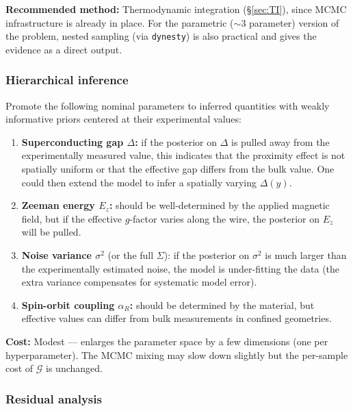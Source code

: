 \documentclass[11pt]{article}
\newcommand{\cG}{\mathcal{G}}
\theoremstyle{plain}
\theoremstyle{remark}
\theoremstyle{definition}
\begin{document}
\medskip
\noindent\textbf{Recommended method:} Thermodynamic integration 
(\S\ref{sec:TI}), since MCMC infrastructure is already in place. For the 
parametric ($\sim 3$ parameter) version of the problem, nested sampling 
(via \texttt{dynesty}) is also practical and gives the evidence as a 
direct output.

\subsubsection{Hierarchical inference}

Promote the following nominal parameters to inferred quantities with 
weakly informative priors centered at their experimental values:
\begin{enumerate}[label=(\roman*)]
\item \textbf{Superconducting gap $\Delta$:} if the posterior on $\Delta$ 
  is pulled away from the experimentally measured value, this indicates 
  that the proximity effect is not spatially uniform or that the 
  effective gap differs from the bulk value. One could then extend the 
  model to infer a spatially varying $\Delta(y)$.
\item \textbf{Zeeman energy $E_z$:} should be well-determined by the 
  applied magnetic field, but if the effective $g$-factor varies along 
  the wire, the posterior on $E_z$ will be pulled.
\item \textbf{Noise variance $\sigma^2$} (or the full $\Sigma$): if the 
  posterior on $\sigma^2$ is much larger than the experimentally estimated 
  noise, the model is under-fitting the data (the extra variance 
  compensates for systematic model error).
\item \textbf{Spin-orbit coupling $\alpha_R$:} should be determined by 
  the material, but effective values can differ from bulk measurements 
  in confined geometries.
\end{enumerate}

\textbf{Cost:} Modest --- enlarges the parameter space by a few dimensions 
(one per hyperparameter). The MCMC mixing may slow down slightly but the 
per-sample cost of $\cG$ is unchanged.

\subsubsection{Residual analysis}
\end{document}
